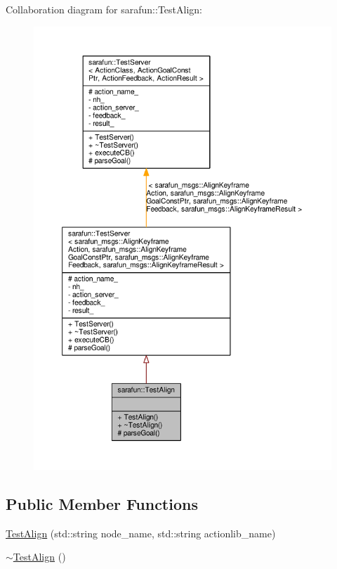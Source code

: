 Collaboration diagram for sarafun\-:\-:Test\-Align\-:
\nopagebreak
\begin{figure}[H]
\begin{center}
\leavevmode
\includegraphics[width=350pt]{d0/d3f/classsarafun_1_1TestAlign__coll__graph}
\end{center}
\end{figure}
\subsection*{Public Member Functions}
\begin{DoxyCompactItemize}
\item 
\hyperlink{classsarafun_1_1TestAlign_aa2815fa88b5bd3f41ba32168d2101d58_aa2815fa88b5bd3f41ba32168d2101d58}{Test\-Align} (std\-::string node\-\_\-name, std\-::string actionlib\-\_\-name)
\item 
\hyperlink{classsarafun_1_1TestAlign_a5d171c40cea90663e8cc6e358132ad3f_a5d171c40cea90663e8cc6e358132ad3f}{$\sim$\-Test\-Align} ()
\end{DoxyCompactItemize}
